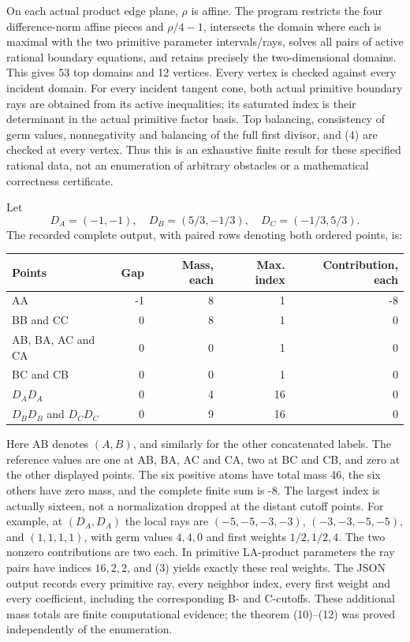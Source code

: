 \documentclass[
  10pt,
]{article}
\begin{document}
On each actual product edge plane, \(\rho\) is affine. The program
restricts the four difference-norm affine pieces and \(\rho/4-1\),
intersects the domain where each is maximal with the two primitive
parameter intervals/rays, solves all pairs of active rational boundary
equations, and retains precisely the two-dimensional domains. This gives
53 top domains and 12 vertices. Every vertex is checked against every
incident domain. For every incident tangent cone, both actual primitive
boundary rays are obtained from its active inequalities; its saturated
index is their determinant in the actual primitive factor basis. Top
balancing, consistency of germ values, nonnegativity and balancing of
the full first divisor, and (4) are checked at every vertex. Thus this
is an exhaustive finite result for these specified rational data, not an
enumeration of arbitrary obstacles or a mathematical correctness
certificate.

Let \[
 D_A=(-1,-1),\quad D_B=(5/3,-1/3),\quad D_C=(-1/3,5/3).
\] The recorded complete output, with paired rows denoting both ordered
points, is:

\begin{longtable}[]{@{}lrrrr@{}}
\toprule\noalign{}
Points & Gap & Mass, each & Max. index & Contribution, each \\
\midrule\noalign{}
\endhead
\bottomrule\noalign{}
\endlastfoot
AA & -1 & 8 & 1 & -8 \\
BB and CC & 0 & 8 & 1 & 0 \\
AB, BA, AC and CA & 0 & 0 & 1 & 0 \\
BC and CB & 0 & 0 & 1 & 0 \\
\(D_AD_A\) & 0 & 4 & 16 & 0 \\
\(D_BD_B\) and \(D_CD_C\) & 0 & 9 & 16 & 0 \\
\end{longtable}

Here AB denotes \((A,B)\), and similarly for the other concatenated
labels. The reference values are one at AB, BA, AC and CA, two at BC and
CB, and zero at the other displayed points. The six positive atoms have
total mass 46, the six others have zero mass, and the complete finite
sum is -8. The largest index is actually sixteen, not a normalization
dropped at the distant cutoff points. For example, at \((D_A,D_A)\) the
local rays are \((-5,-5,-3,-3)\), \((-3,-3,-5,-5)\), and \((1,1,1,1)\),
with germ values \(4,4,0\) and first weights \(1/2,1/2,4\). The two
nonzero contributions are two each. In primitive LA-product parameters
the ray pairs have indices \(16,2,2\), and (3) yields exactly these real
weights. The JSON output records every primitive ray, every neighbor
index, every first weight and every coefficient, including the
corresponding B- and C-cutoffs. These additional mass totals are finite
computational evidence; the theorem (10)--(12) was proved independently
of the enumeration.
\end{document}
